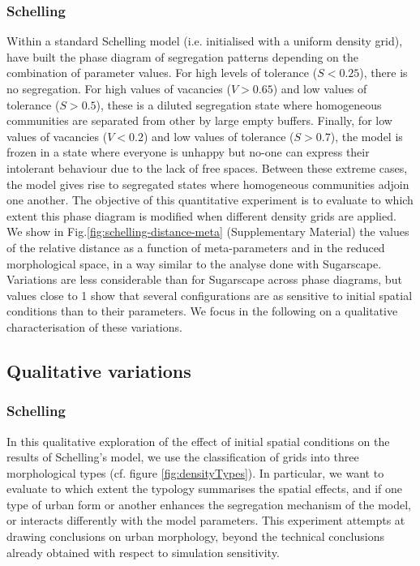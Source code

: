 \documentclass{JASSS}
\begin{document}
\subsubsection{Schelling} 
Within a standard Schelling model (i.e. initialised with a uniform density grid), \citet{Gauvinetal2009} have built the phase diagram of segregation patterns depending on the combination of parameter values. For high levels of tolerance ($S < 0.25$), there is no segregation. For high values of vacancies ($V > 0.65$) and low values of tolerance ($S > 0.5$), these is a diluted segregation state where homogeneous communities are separated from other by large empty buffers. Finally, for low values of vacancies ($V < 0.2$) and low values of tolerance ($S > 0.7$), the model is frozen in a state where everyone is unhappy but no-one can express their intolerant behaviour due to the lack of free spaces. Between these extreme cases, the model gives rise to segregated states where homogeneous communities adjoin one another. The objective of this quantitative experiment is to evaluate to which extent this phase diagram is modified when different density grids are applied. We show in Fig.\ref{fig:schelling-distance-meta} (Supplementary Material) the values of the relative distance as a function of meta-parameters and in the reduced morphological space, in a way similar to the analyse done with Sugarscape. Variations are less considerable than for Sugarscape across phase diagrams, but values close to 1 show that several configurations are as sensitive to initial spatial conditions than to their parameters. We focus in the following on a qualitative characterisation of these variations.

\subsection{Qualitative variations}
\label{sec:qualResults}

\subsubsection{Schelling}

In this qualitative exploration of the effect of initial spatial conditions on the results of Schelling's model, we use the classification of grids into three morphological types (cf. figure \ref{fig:densityTypes}). In particular, we want to evaluate to which extent the typology summarises the spatial effects, and if one type of urban form or another enhances the segregation mechanism of the model, or interacts differently with the model parameters. This experiment attempts at drawing conclusions on urban morphology, beyond the technical conclusions already obtained with respect to simulation sensitivity.
\end{document}
